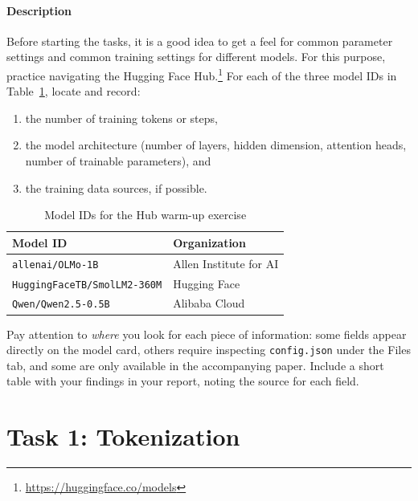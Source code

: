 \paragraph{Description} Before starting the tasks, it is a good idea to get a feel for  common parameter settings and common training settings for different models. For this purpose, practice navigating the Hugging Face Hub.\footnote{\url{https://huggingface.co/models}}  For each of the three model IDs in Table~\ref{tab:hub-warmup}, locate and record:
\begin{enumerate}[label=\arabic*.]
    \item the number of training tokens or steps,
    \item the model architecture (number of layers, hidden dimension, attention heads, number of trainable parameters), and
    \item the training data sources, if possible.
\end{enumerate}

\begin{table}[h]
\centering

\begin{tabular}{ll}
\toprule
\textbf{Model ID} & \textbf{Organization} \\
\midrule
\texttt{allenai/OLMo-1B}            & Allen Institute for AI \\
\texttt{HuggingFaceTB/SmolLM2-360M} & Hugging Face \\
\texttt{Qwen/Qwen2.5-0.5B}          & Alibaba Cloud \\
\bottomrule
\end{tabular}
\caption{Model IDs for the Hub warm-up exercise}
\label{tab:hub-warmup}
\end{table}

Pay attention to \emph{where} you look for each piece of information: some fields appear directly on the model card, others require inspecting \texttt{config.json} under the Files tab, and some are only available in the accompanying paper. Include a short table with your findings in your report, noting the source for each field.

\section{Task 1: Tokenization}
\label{sec:task1}

